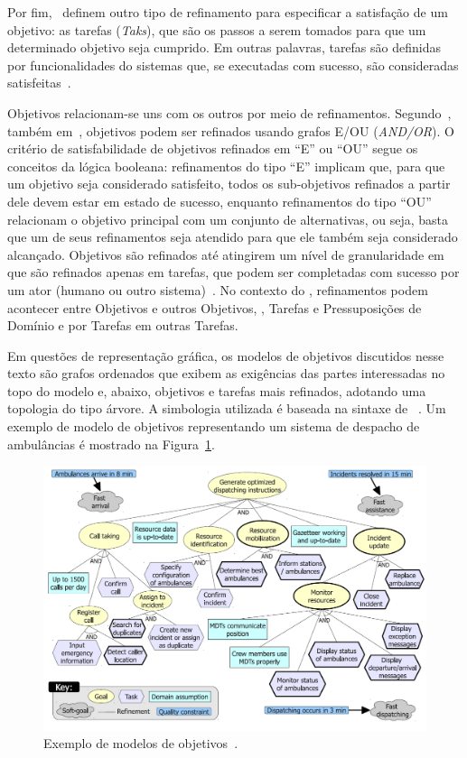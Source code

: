 Por fim,~ definem outro tipo de refinamento para especificar a satisfação de um objetivo: as tarefas (\textit{Taks}), que são os passos a serem tomados para que um determinado objetivo seja cumprido. Em outras palavras, tarefas são definidas por funcionalidades do sistemas que, se executadas com sucesso, são consideradas satisfeitas~\cite{souza2012requirement}.

Objetivos relacionam-se uns com os outros por meio de refinamentos. Segundo~, também em~\cite{dardenne1993goal}, objetivos podem ser refinados usando grafos E/OU (\textit{AND/OR}). O critério de satisfabilidade de objetivos refinados em ``E'' ou ``OU'' segue os conceitos da lógica booleana: refinamentos do tipo ``E'' implicam que, para que um objetivo seja considerado satisfeito, todos os sub-objetivos refinados a partir dele devem estar em estado de sucesso, enquanto refinamentos do tipo ``OU'' relacionam o objetivo principal com um conjunto de alternativas, ou seja, basta que um de seus refinamentos seja atendido para que ele também seja considerado alcançado. Objetivos são refinados até atingirem um nível de granularidade em que são refinados apenas em tarefas, que podem ser completadas com sucesso por um ator (humano ou outro sistema)~\cite{souza2013awareness}. No contexto do \zanshin, refinamentos podem acontecer entre Objetivos e outros Objetivos, \sofgoals, Tarefas e Pressuposições de Domínio e por Tarefas em outras Tarefas.

Em questões de representação gráfica, os modelos de objetivos discutidos nesse texto são grafos ordenados que exibem as exigências das partes interessadas no topo do modelo e, abaixo, objetivos e tarefas mais refinados, adotando uma topologia do tipo árvore. A simbologia utilizada é baseada na sintaxe de \istar~\cite{yu20111}. Um exemplo de modelo de objetivos representando um sistema de despacho de ambulâncias é mostrado na Figura~\ref{figura-acad-simples}.

\begin{figure}
	\centering
	\includegraphics[width=1\textwidth]{figuras/modelos/ACAD-Simples.png}
	\caption{Exemplo de modelos de objetivos~\cite{tesevitor}.}
	\label{figura-acad-simples}
\end{figure}

